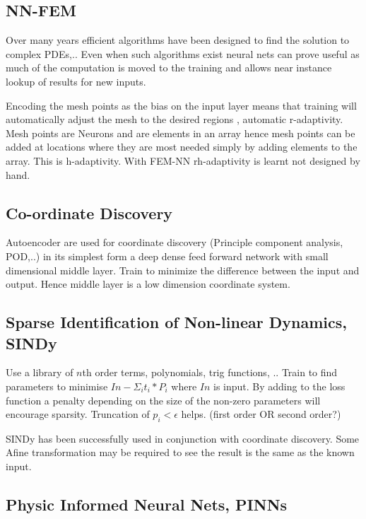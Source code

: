 \subsection{NN-FEM}

Over many years efficient algorithms have been designed to find the solution to complex PDEs,..  Even when such algorithms exist neural nets can prove useful as much of the computation is moved to the training and allows near instance lookup of results for new inputs.

  Encoding the mesh points as the bias on the input layer means that training will automatically adjust the mesh to the desired regions , automatic r-adaptivity. Mesh points are Neurons and are elements in an array hence mesh points can be added at locations where they are most needed simply by adding elements to the array. This is h-adaptivity. With FEM-NN rh-adaptivity is learnt not designed by hand.

\subsection{Co-ordinate Discovery}
Autoencoder are used for coordinate discovery (Principle component analysis,  POD,..) in its simplest form a deep dense feed forward network with small dimensional middle layer. Train to minimize the difference between the input and output. Hence middle layer is a low dimension coordinate system.

\subsection{Sparse Identification of Non-linear Dynamics, SINDy}
Use a library of $n$th order terms, polynomials, trig functions, .. Train to find parameters to minimise $In-\Sigma_i t_i*P_i$ where $In$ is input. By adding to the loss function a penalty depending on the size of the non-zero parameters will encourage sparsity. Truncation of $p_i< \epsilon$ helps. (first order OR second order?)

SINDy has been successfully  used in conjunction with coordinate discovery. Some Afine transformation may be required to see the result is the same as the known input.


\subsection{Physic Informed Neural Nets, PINNs}

